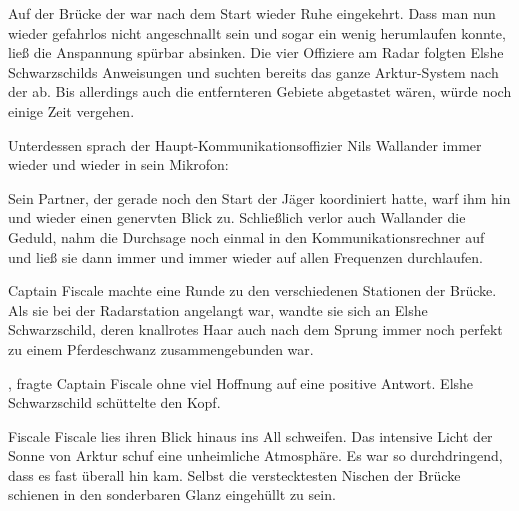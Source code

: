 Auf der Brücke der  war nach dem Start wieder Ruhe eingekehrt. Dass man nun wieder gefahrlos nicht angeschnallt sein und sogar ein wenig herumlaufen konnte, ließ die Anspannung spürbar absinken. Die vier Offiziere am Radar folgten Elshe Schwarzschilds Anweisungen und suchten bereits das ganze Arktur-System nach der  ab. Bis allerdings auch die entfernteren Gebiete abgetastet wären, würde noch einige Zeit vergehen.

\par

Unterdessen sprach der Haupt-Kommunikationsoffizier Nils Wallander immer wieder und wieder in sein Mikrofon: 

\par

Sein Partner, der gerade noch den Start der Jäger koordiniert hatte, warf ihm hin und wieder einen genervten Blick zu. Schließlich verlor auch Wallander die Geduld, nahm die Durchsage noch einmal in den Kommunikationsrechner auf und ließ sie dann immer und immer wieder auf allen Frequenzen durchlaufen.

\par

Captain Fiscale machte eine Runde zu den verschiedenen Stationen der Brücke. Als sie bei der Radarstation angelangt war, wandte sie sich an Elshe Schwarzschild, deren knallrotes Haar auch nach dem Sprung immer noch perfekt zu einem Pferdeschwanz zusammengebunden war.

\par

, fragte Captain Fiscale ohne viel Hoffnung auf eine positive Antwort. Elshe Schwarzschild schüttelte den Kopf. 

\par

Fiscale Fiscale lies ihren Blick hinaus ins All schweifen. Das intensive Licht der Sonne von Arktur schuf eine unheimliche Atmosphäre. Es war so durchdringend, dass es fast überall hin kam. Selbst die verstecktesten Nischen der Brücke schienen in den sonderbaren Glanz eingehüllt zu sein.

\par

